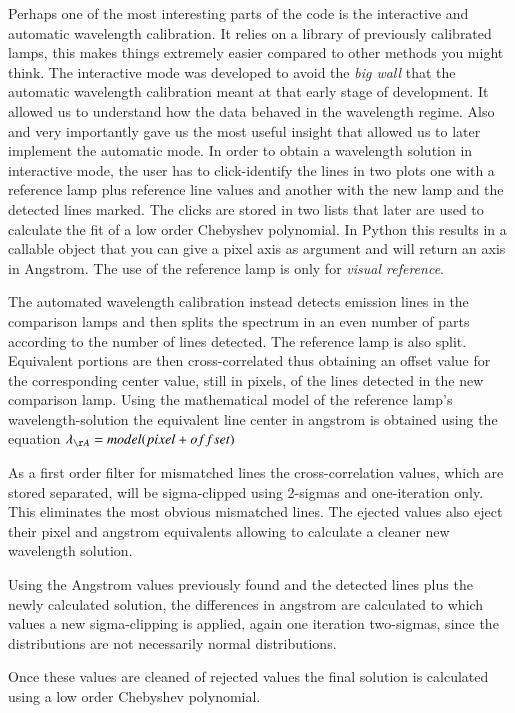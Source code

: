 \documentclass[11pt,twoside]{article}
\begin{document}
Perhaps one of the most interesting parts of the code is the interactive and
automatic wavelength calibration. It relies on a library of previously calibrated
lamps, this makes things extremely easier compared to other methods you might think.
The interactive mode was developed to avoid the \emph{big wall} that the automatic
wavelength calibration meant at that early stage of development. It allowed us to 
understand how the data behaved in the wavelength regime. Also and very importantly
gave us the most useful insight that allowed us to later implement the automatic mode.
In order to obtain a wavelength solution in interactive mode, the user has to click-identify 
the lines in two plots one with a reference lamp plus reference line values and
another with the new lamp and the detected lines marked. The clicks are stored in
two lists that later are used to calculate the fit of a low order Chebyshev polynomial.
In Python this results in a callable object that you can give a pixel axis as argument 
and will return an axis in Angstrom. The use of the reference lamp is only for
\emph{visual reference}.

The automated wavelength calibration instead detects emission lines in the comparison lamps
and then splits the spectrum in an even number of parts according to the number of lines detected.
The reference lamp is also split. Equivalent portions are then cross-correlated 
thus obtaining an offset value for the corresponding center value, still in pixels, 
of the lines detected in the new comparison lamp. Using the mathematical model of the reference
lamp's wavelength-solution  the equivalent line center in angstrom is obtained 
using the equation $ \lambda_{\AA} = model(pixel + offset)$


As a first order filter for mismatched lines the cross-correlation values, which
are stored separated, will be sigma-clipped using 2-sigmas and one-iteration only.
This eliminates the most obvious mismatched lines. The ejected values also eject
their pixel and angstrom equivalents allowing to calculate a cleaner new wavelength solution.


Using the Angstrom values previously found and the detected lines
plus the newly calculated solution, the differences in angstrom are
calculated to which values a new sigma-clipping is applied, again
one iteration two-sigmas, since the distributions are not
necessarily normal distributions.

Once these values are cleaned of rejected values the final solution
is calculated using a low order Chebyshev polynomial.
\end{document}
